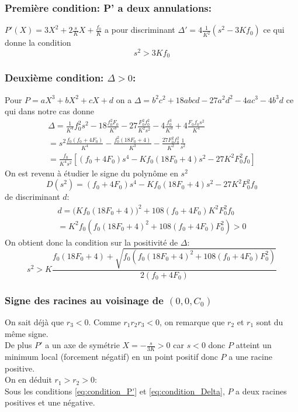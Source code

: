 \subsubsection{Première condition: P' a deux annulations:}
$P'(X)= 3X^2+ 2\frac{s}{K}X+ \frac{f_0}{K}$ a pour discriminant $\Delta'=4\frac{1}{K^2}(s^2-3Kf_0)$ ce qui donne la condition \begin{equation} \label{eq:condition_P'}
	\boxed{s^2 >3K f_0
	}
\end{equation}
\subsubsection{Deuxième condition: $\Delta>0$:}
Pour $P=aX^3 +bX^2 + cX + d$ on a $\Delta= b^2c^2 +18abcd-27a^2d^2 -4ac^3 -4b^3d$ ce qui dans notre cas donne
\begin{align*}
	\Delta=\frac{1}{K^4}f_0^2s^2 -18 \frac{f_0^2F_0}{K^3}-27 \frac{F_0^2 f_0^2}{K^2s^2} - 4 \frac{f_0^3}{K^3}+4 \frac{F_0f_0s^2}{K^4} \\ = s^2 \frac{f_0(f_0+4F_0)}{K^4}- \frac{f_0^2(18F_0+4)}{K^3} -\frac{27F_0^2f_0^2}{K^2} \frac{1}{s^2}\\ 
=	\frac{f_0}{K^4s^2}[(f_0+4F_0)s^4-Kf_0(18F_0+4) s^2 - 27 K^2F_0^2f_0] \end{align*}
On est revenu à étudier le signe du polynôme en $s^2$ \begin{equation}
	D(s^2)=(f_0+4F_0)s^4-Kf_0(18F_0+4)s^2 - 27 K^2F_0^2f_0
\end{equation} 
de discriminant $d$:
\begin{align*}
	d=\Big(Kf_0(18F_0+4) \Big)^2 +108(f_0+4F_0)K^2F_0^2f_0 \\ 
	= K^2f_0(f_0(18F_0+4)^2+108(f_0+4F_0)F_0^2) >0
\end{align*}
On obtient donc la condition sur la positivité de $\Delta$: 
\begin{equation}\boxed{
	s^2> K\frac{f_0(18F_0+4)+\sqrt{f_0(f_0(18F_0+4)^2+108(f_0+4F_0)F_0^2)}}{2(f_0+4F_0)}
	}\label{eq:condition_Delta}
\end{equation}
\subsubsection{Signe des racines au voisinage de $(0,0,C_0)$}
On sait déjà que $r_3<0$. Comme $r_1r_2r_3<0$, on remarque que $r_2$ et $r_1$ sont du même signe.\\
De plus $P'$ a un axe de symétrie $X=-\frac{s}{3K}>0$ car $s<0$ donc $P$ atteint un minimum local (forcement négatif) en un point positif donc $P$ a une racine positive.\\
On en déduit $r_1>r_2>0$: \\ 
Sous les conditions \eqref{eq:condition_P'} et \eqref{eq:condition_Delta}, $P$ a deux racines positives et une négative.
